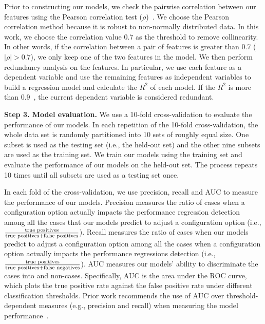 Prior to constructing our models, we check the pairwise correlation between our features using the Pearson correlation test (\(\rho\))~\cite{benesty2009pearson}. We choose the Pearson correlation method because it is robust to non-normally distributed data. In this work, we choose the correlation value $0.7$ as the threshold to remove collinearity. In other words, if the correlation between a pair of features is greater than 0.7 (\(|\rho|>0.7\)), we only keep one of the two features in the model.
We then perform redundancy analysis on the features. In particular, we use each feature as a dependent variable and use the remaining features as independent variables to build a regression model and calculate the $R^2$ of each model. If the $R^2$ is more than 0.9~\cite{markASE}, the current dependent variable is considered redundant. 

\noindent\textbf{Step 3. Model evaluation.}
We use a 10-fold cross-validation to evaluate the performance of our models. %
In each repetition of the 10-fold cross-validation, the whole data set is randomly partitioned into 10 sets of roughly equal size. One subset is used as the testing set (i.e., the held-out set) and the other nine subsets are used as the training set. 
We train our models using the training set and evaluate the performance of our models on the held-out set.
The process repeats 10 times until all subsets are used as a testing set once.

In each fold of the cross-validation, we use precision, recall and 
AUC to measure the performance of our models.
Precision measures the ratio of cases when a configuration option actually impacts the performance regression detection among all the cases that our models predict to adjust a configuration option (i.e., $\frac{\textnormal{true positives}}{\textnormal{true positives} + \textnormal{false positives}}$). Recall measures the ratio of cases when our models predict to adjust a configuration option among all the cases when a configuration option actually impacts the performance regressions detection (i.e., $\frac{\textnormal{true positives}}{\textnormal{true positives} + \textnormal{false negatives}}$). 
AUC measures our models' ability to discriminate the \instance cases into \inconsistent and non-\inconsistent cases. Specifically, AUC is the area under the ROC curve, which plots the true positive rate against the false positive rate under different classification thresholds. 
Prior work recommends the use of AUC over threshold-dependent measures (e.g., precision and recall) when measuring the model performance~\cite{tantithamthavorn18experience}.


